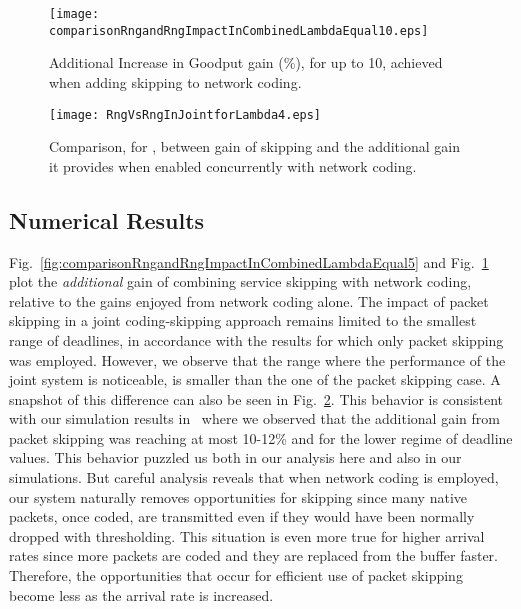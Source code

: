 \documentclass[preprint,12pt]{elsarticle}
\theoremstyle{definition}
\theoremstyle{plain}
\theoremstyle{remark}
\begin{document}
\begin{figure}[t]
\begin{center}
  \texttt{[image: comparisonRngandRngImpactInCombinedLambdaEqual10.eps]}
\end{center}
  \caption{Additional Increase in Goodput gain (\%), for  up to 10, achieved when adding skipping to network coding.}
  \label{fig:comparisonRngandRngImpactInCombinedLambdaEqual10}
\end{figure}


\begin{figure}[t]
\begin{center}
  \texttt{[image: RngVsRngInJointforLambda4.eps]}
\end{center}
  \caption{Comparison, for , between gain of skipping and the additional gain it provides when enabled concurrently with network coding.}
  \label{fig:RngVsRngInJointforLambda4}
\end{figure}

\subsection{Numerical Results} \label{section:numerical-results-joint}
Fig.~\ref{fig:comparisonRngandRngImpactInCombinedLambdaEqual5} and Fig.~\ref{fig:comparisonRngandRngImpactInCombinedLambdaEqual10} plot the \textit{additional} gain of combining service skipping with network coding, relative to the gains enjoyed from network coding alone. The impact of packet skipping in a joint coding-skipping approach remains limited to the smallest range of deadlines, in accordance with the results for which only packet skipping was employed. However, we observe that the range where the performance of the joint system is noticeable, is smaller than the one of the packet skipping case. A snapshot of this difference can also be seen in Fig.~\ref{fig:RngVsRngInJointforLambda4}. This behavior is consistent with our simulation results in~\cite{aoun-ewsn2011} where we observed that the additional gain from packet skipping was reaching at most 10-12\% and for the lower regime of deadline values. This behavior puzzled us both in our analysis here and also in our simulations. But careful analysis reveals that when network coding is employed, our system naturally removes opportunities for skipping since many native packets, once coded, are transmitted even if they would have been normally dropped with thresholding. This situation is even more true for higher arrival rates since more packets are coded and they are replaced from the buffer faster. Therefore, the opportunities that occur for efficient use of packet skipping become less as the arrival rate is increased.
\end{document}

